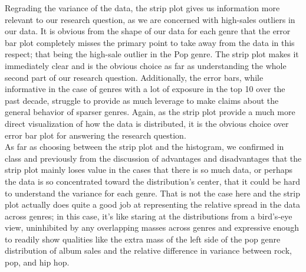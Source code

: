 Regrading the variance of the data, the strip plot gives us information more relevant to our research question, as we are concerned with high-sales outliers in our data. It is obvious from the shape of our data for each genre that the error bar plot completely misses the primary point to take away from the data in this respect; that being the high-sale outlier in the Pop genre. The strip plot makes it immediately clear and is the obvious choice as far as understanding the whole second part of our research question. Additionally, the error bars, while informative in the case of genres with a lot of exposure in the top 10 over the past decade, struggle to provide as much leverage to make claims about the general behavior of sparser genres. Again, as the strip plot provide a much more direct visualization of how the data is distributed, it is the obvious choice over error bar plot for answering the research question. \\

As far as choosing between the strip plot and the histogram, we confirmed in class and previously from the discussion of advantages and disadvantages that the strip plot mainly loses value in the cases that there is so much data, or perhaps the data is so concentrated toward the distribution's center, that it could be hard to understand the variance for each genre. That is not the case here and the strip plot actually does quite a good job at representing the relative spread in the data across genres; in this case, it's like staring at the distributions from a bird's-eye view, uninhibited by any overlapping masses across genres and expressive enough to readily show qualities like the extra mass of the left side of the pop genre distribution of album sales and the relative difference in variance between rock, pop, and hip hop.
\newpage